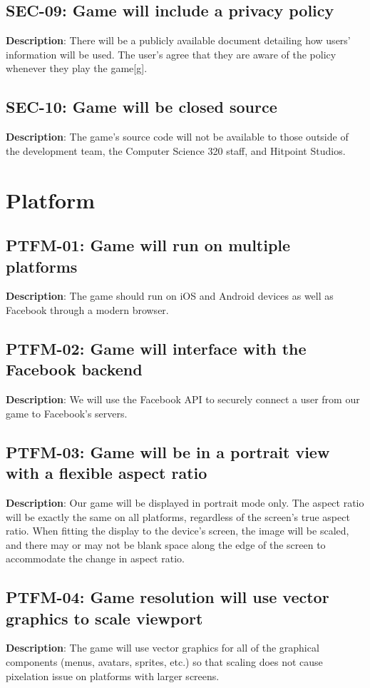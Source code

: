 \subsection{SEC-09: Game will include a privacy policy}
\textbf{Description}: There will be a publicly available document detailing
how users\textquoteright{} information will be used. The user\textquoteright{}s
agree that they are aware of the policy whenever they play the game{[}g{]}.
\subsection{SEC-10: Game will be closed source}
\textbf{Description}: The game\textquoteright{}s source code will not be available
to those outside of the development team, the Computer Science 320
staff, and Hitpoint Studios.
\section{Platform}
\subsection{PTFM-01: Game will run on multiple platforms}
\textbf{Description}: The game should run on iOS and Android devices as well
as Facebook through a modern browser.
\subsection{PTFM-02: Game will interface with the Facebook backend}
\textbf{Description}: We will use the Facebook API to securely connect a user
from our game to Facebook\textquoteright{}s servers.
\subsection{PTFM-03: Game will be in a portrait view with a flexible aspect ratio}
\textbf{Description}: Our game will be displayed in portrait mode only. The
aspect ratio will be exactly the same on all platforms, regardless
of the screen\textquoteright{}s true aspect ratio. When fitting the
display to the device\textquoteright{}s screen, the image will be
scaled, and there may or may not be blank space along the edge of
the screen to accommodate the change in aspect ratio.
\subsection{PTFM-04: Game resolution will use vector graphics to scale viewport}
\textbf{Description}: The game will use vector graphics for all of
the graphical components (menus, avatars, sprites, etc.) so that scaling
does not cause pixelation issue on platforms with larger screens. 